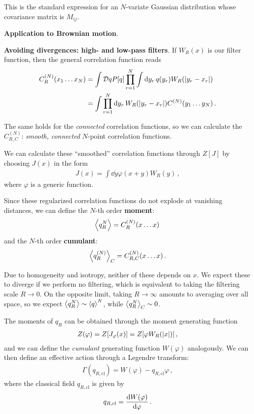 \documentclass[main.tex]{subfiles}
\begin{document}
This is the standard expression for an \(N\)-variate Gaussian distribution whose covariance matrix is \(M_{ij}\). 

\textbf{Application to Brownian motion}. 

\textbf{Avoiding divergences: high- and low-pass filters}. 
If \(W_R (x)\) is our filter function, then the general correlation function reads 
%
\begin{align}
C^{(N)}_R (x_1 \dots x_N) &= \int \mathcal{D}q P[q] \prod_{r = 1}^{N}
\int \dd{y_r} q(y_r) W_R (\abs{y_r - x_r})  \\
&= \int \prod_{r=1}^{N} \dd{y_r} W_R(\abs{y_r - x_r}) C^{(N)} (y_1 \dots y_N)
\,.
\end{align}

The same holds for the \emph{connected} correlation functions, so we can calculate the \(C^{(N)}_{R, C}\): \emph{smooth, connected} \(N\)-point correlation functions. 

We can calculate these ``smoothed'' correlation functions through \(Z[J]\) by choosing \(J(x)\) in the form 
%
\begin{align}
J(x) =\int \dd{y} \varphi (x+y) W_R (y)
\,,
\end{align}
%
where \(\varphi \) is a generic function.

Since these regularized correlation functions do not explode at vanishing distances, we can define the \(N\)-th order \textbf{moment}:
%
\begin{align}
\expval{q_R^{N}} = C^{(N)}_R (x \dots x) 
\,
\end{align}
%
and the \(N\)-th order \textbf{cumulant}: 
%
\begin{align}
\expval{q_R^{(N)}}_C = C^{(N)}_{R, C} (x \dots x)
\,.
\end{align}

Due to homogeneity and isotropy, neither of these depends on \(x\). 
We expect these to diverge if we perform no filtering, which is equivalent to taking the filtering scale \(R \to 0\).
On the opposite limit, taking \(R \to \infty \) amounts to averaging over all space, so we expect \(\expval{q_R^{N}} \sim \expval{q}^{N}\), while \(\expval{q_R^{N}}_C \sim 0\). 

The moments of \(q_R\) can be obtained through the moment generating function 
%
\begin{align}
Z(\varphi ) = Z[J_\varphi (x) ] = Z[\varphi W_R (\abs{x})]
\,,
\end{align}
%
and we can define the \emph{cumulant} generating function \(W(\varphi )\) analogously. 
We can then define an effective action through a Legendre transform:
%
\begin{align}
\Gamma (q_{R, \text{cl}}) = W(\varphi ) - q_{R, \text{cl}} \varphi 
\,,
\end{align}
%
where the classical field \(q_{R, \text{cl}}\) is given by 
%
\begin{align}
q_{R, \text{cl}} = \dv{W(\varphi )}{\varphi }
\,.
\end{align}
\end{document}
